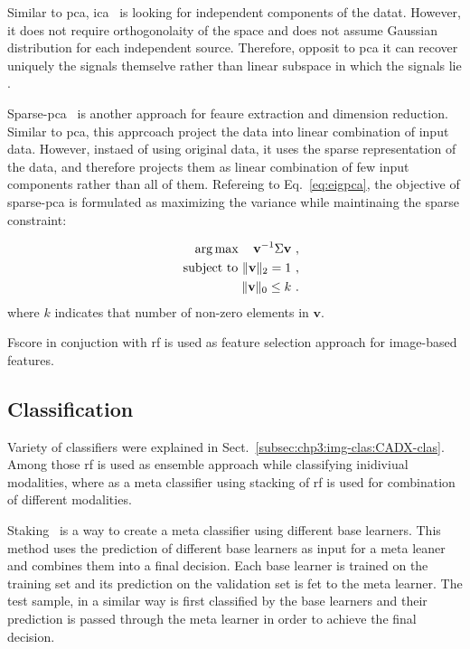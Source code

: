 Similar to \ac{pca}, \ac{ica}~\cite{comon1994independent} is looking for independent components of the datat.
However, it does not require orthogonolaity of the space and does not assume Gaussian distribution for each independent source.
Therefore, opposit to \ac{pca} it can recover uniquely the signals themselve rather than  linear subspace in which the signals lie \cite{murphy2012machine}.


Sparse-\ac{pca}~\cite{zou2006sparse} is another approach for feaure extraction and dimension reduction.
Similar to \ac{pca}, this apprcoach project the data into linear combination of input data.
However, instaed of using original data, it uses the sparse representation of the data, and therefore projects them as linear combination of few input components rather than all of them.
Refereing to Eq.~\eqref{eq:eigpca}, the objective of sparse-\ac{pca} is formulated as maximizing the variance while maintinaing the sparse constraint:

\begin{eqnarray}
 && \operatorname*{arg\,max} \quad   \mathbf{v}^{-1} \Sigma \mathbf{v}\ , \label{eq:sparsepca}\\ 
 && \text{subject to }  \Vert \mathbf{v} \Vert_{2} = 1\ , \nonumber \\
 && \Vert \mathbf{v} \Vert_{0} \leq k\ . \nonumber
\end{eqnarray}
\noindent where $k$ indicates that number of non-zero elements in $\mathbf{v}$.

Fscore in conjuction with \ac{rf} is used as feature selection approach for image-based features.


\subsection{Classification}\label{subsec:chp6:method:clas}
Variety of classifiers were explained in Sect.~\ref{subsec:chp3:img-clas:CADX-clas}. 
Among those \ac{rf} is used as ensemble approach while classifying inidiviual modalities, where as a meta classifier using stacking of \ac{rf} is used for combination of different modalities.

Staking~\cite{wolpert1992stacked} is a way to create a meta classifier using different base learners.
This method uses the prediction of different base learners as input for a meta leaner and combines them into a final decision.
Each base learner is trained on the training set and its prediction on the validation set is fet to the meta learner.
The test sample, in a similar way is first classified by the base learners and their prediction is passed through the meta learner in order to achieve the final decision.

 
